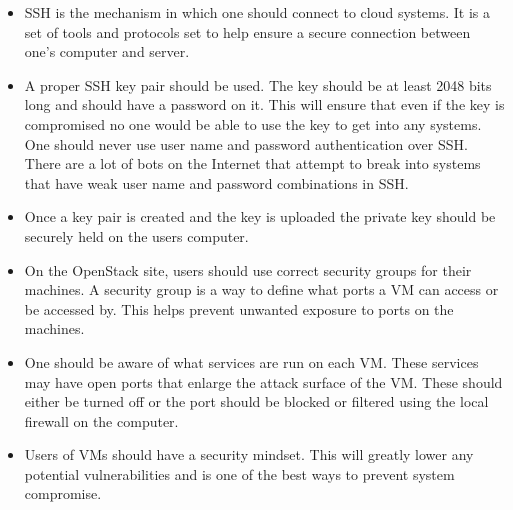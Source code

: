\documentclass[12pt]{article}
\begin{document}
\begin{itemize}
    \item SSH is the mechanism in which one should connect to cloud systems. It is a set of tools and protocols set to help ensure a secure connection between one's computer and server.
    \item A proper SSH key pair should be used. The key should be at least 2048 bits long and should have a password on it. This will ensure that even if the key is compromised no one would be able to use the key to get into any systems. One should never use user name and password authentication over SSH. There are a lot of bots on the Internet that attempt to break into systems that have weak user name and password combinations in SSH.
    \item Once a key pair is created and the key is uploaded the private key should be securely held on the users computer.
    \item On the OpenStack site, users should use correct security groups for their machines. A security group is a way to define what ports a VM can access or be accessed by. This helps prevent unwanted exposure to ports on the machines.
    \item One should be aware of what services are run on each VM. These services may have open ports that enlarge the attack surface of the VM. These should either be turned off or the port should be blocked or filtered using the local firewall on the computer.
    \item Users of VMs should have a security mindset. This will greatly lower any potential vulnerabilities and is one of the best ways to prevent system compromise.

\end{itemize}
\end{document}
